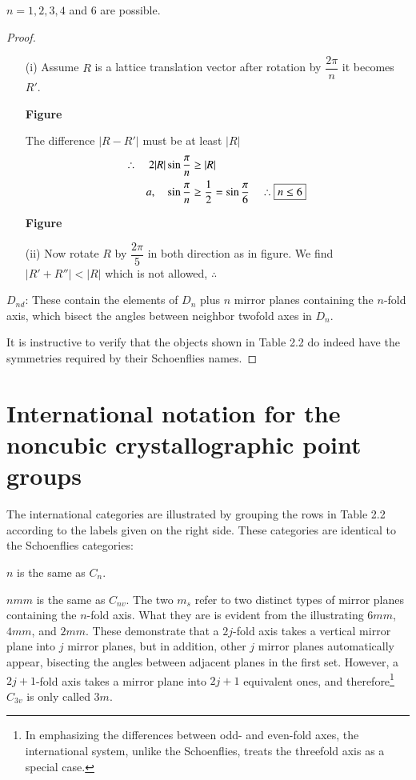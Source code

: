 $n=1,2,3,4$ and $6$ are possible.

\begin{proof}
\begin{itemize}
\item[(i)] Assume $R$ is a lattice translation vector after rotation by $\dfrac{2\pi}{n}$ it becomes $R'$.
\begin{center}
{\bf Figure}
\end{center}
The difference $|R-R'|$ must be at least $|R|$
\begin{align*}
\therefore\quad 2|R|\sin \dfrac{\pi}{n} &\geq |R|\\
a,\quad \sin \dfrac{\pi}{n} &\geq \dfrac{1}{2}=\sin \dfrac{\pi}{6}\quad \therefore \fbox{$n\leq 6$}
\end{align*}
\begin{center}
{\bf Figure}
\end{center}

\item[(ii)] Now rotate $R$ by $\dfrac{2\pi}{5}$ in both direction as in figure. We find $|R'+R''|<|R|$ which is not allowed, $\therefore$ \ 
\end{itemize}

$D_{nd}$: These contain the elements of $D_{n}$ plus $n$ mirror planes containing the $n$-fold axis, which bisect the angles between neighbor twofold axes in $D_{n}$.

It is instructive to verify that the objects shown in Table 2.2 do indeed have the symmetries required by their Schoenflies names.
\end{proof}

\section*{International notation for the noncubic crystallographic point groups}

The international categories are illustrated by grouping the rows in Table 2.2 according to the labels given on the right side. These categories are identical to the Schoenflies categories:

$n$ is the same as $C_{n}$.

$nmm$ is the same as $C_{nv}$. The two $m_{s}$ refer to two distinct types of mirror planes containing the $n$-fold axis. What they are is evident from the illustrating $6mm$, $4mm$, and $2mm$. These demonstrate that a $2j$-fold axis takes a vertical mirror plane into $j$ mirror planes, but in addition, other $j$ mirror planes automatically appear, bisecting the angles between adjacent planes in the first set. However, a $2j+1$-fold axis takes a mirror plane into $2j+1$ equivalent ones, and therefore\footnote{In emphasizing the differences between odd- and even-fold axes, the international system, unlike the Schoenflies, treats the threefold axis as a special case.} $C_{3v}$ is only called $3m$.

